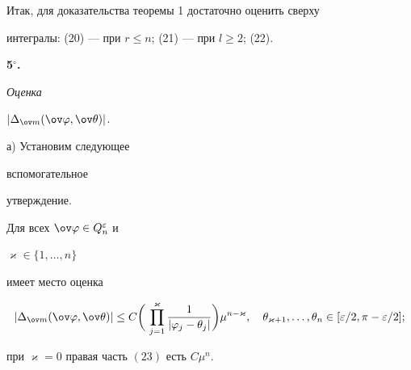  


Итак, для доказательства теоремы 1 достаточно оценить сверху 


интегралы: (20) --- при $r\le n$; (21) --- при $l\ge 2$; (22). 


\medskip 


 


 


{\bf 5${}^\circ$.} {\it Оценка 


$|\Delta_{\ov m}(\ov\varphi,\ov\theta)|$.} а) Установим следующее 


вспомогательное 


утверждение. 


 


\begin{lem} 


Для всех $\ov\varphi\in Q^\varepsilon_n$ и 


$\varkappa\in\{1,\dotsc,n\}$ 


имеет место оценка 


\begin{equation} 


|\Delta_{\ov m}(\ov\varphi,\ov\theta)|\le C\bigg(\, 


\prod^\varkappa_{j=1}\frac{1}{|\varphi_j-\theta_j|}\bigg) 


\mu^{n-\varkappa},\quad 


\theta_{\varkappa+1},\dotsc,\theta_n\in 


[\varepsilon/2,\pi-\varepsilon/2]; 


\end{equation} 


при $\varkappa=0$ правая часть $(23)$ есть $C \mu^n$. 


\end{lem} 


 


